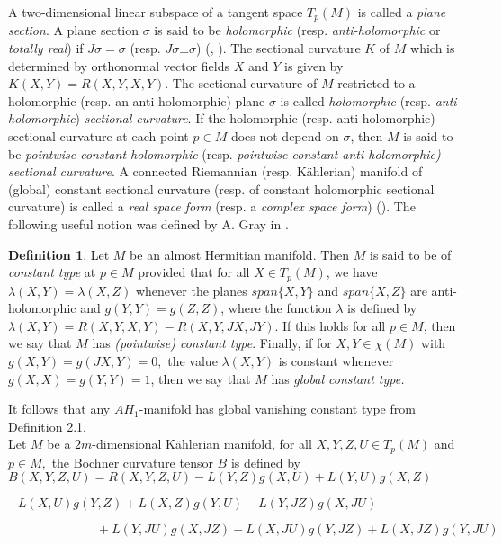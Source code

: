 \documentclass{amsart}
\newtheorem*{theorem A}{Theorem A}
\newtheorem*{theorem B}{N\"olker's Theorem}
\theoremstyle{remark}
\theoremstyle{remark}
\theoremstyle{definition}
\newtheorem{definition}{Definition}[section]
\numberwithin{equation}{section}
\begin{document}
A  two-dimensional linear subspace of a tangent space $T_{p}(M)$ is
called a \emph{plane section}. A plane section $\sigma$ is said to
be \emph{holomorphic} (resp.\emph{ anti-holomorphic} or
\emph{totally real}) if $J\sigma=\sigma$ (resp. $J\sigma\bot\sigma$)
(\cite{BChe}, \cite{Yama}). The sectional curvature $K$ of $M$ which
is determined by orthonormal vector fields $X$ and $Y$ is given by
$K(X,Y)=R(X,Y,X,Y).$ The  sectional curvature of $M$ restricted to a
holomorphic (resp. an anti-holomorphic) plane $\sigma$ is called
\emph{holomorphic} (resp. \emph{anti-holomorphic}) \emph{sectional
curvature}. If the holomorphic (resp. anti-holomorphic) sectional
curvature at each point $p\in M$ does not depend on $\sigma$, then
$M$ is said to be \emph{ pointwise constant holomorphic} (resp.
\emph{pointwise constant anti-holomorphic) sectional curvature}. A
connected Riemannian (resp. K\"{a}hlerian) manifold of (global)
constant sectional curvature (resp. of constant holomorphic
sectional curvature) is called a \emph{real space form} (resp. a
\emph{complex space form}) (\cite{BChe,Vanh,Kas,Yan}). The following
useful notion was defined by A. Gray in \cite{Gray}.
\begin{definition} Let $M$ be an almost Hermitian manifold. Then $M$ is said
to be of \emph{constant type} at  $p\in M$ provided that for all
$X\in T_{p}(M)$, we have $\lambda(X,Y)=\lambda(X,Z)$ whenever the
planes  $span\{X,Y\}$ and $span\{X,Z\}$ are  anti-holomorphic and
$g(Y,Y)=g(Z,Z)$, where the function $\lambda$ is defined by
$\lambda(X,Y)=R(X,Y,X,Y)-R(X,Y,JX,JY)$. If this holds for all $p\in
M$, then we say that  $M$ has \emph{(pointwise) constant type}.
Finally, if for $X,Y\in\chi(M)$ with $g(X,Y)=g(JX,Y)=0,$ the value
$\lambda(X,Y)$ is constant whenever $g(X,X)=g(Y,Y)=1$,
 then we say that $M$ has \emph{global constant type.}
\end{definition}
It follows that any $AH_{1}$-manifold has global vanishing constant type from Definition 2.1.\\

Let $M$ be a $2m$-dimensional K\"{a}hlerian manifold, for all $X,Y,Z,U\in T_{p}(M)$ and $p\in M,$
the Bochner curvature tensor $B$ \cite{Kassab} is defined by\\

$B(X,Y,Z,U)=R(X,Y,Z,U)-L(Y,Z)g(X,U)+L(Y,U)g(X,Z)$

$\quad\quad\quad\quad\quad\quad\quad$$-L(X,U)g(Y,Z)+L(X,Z)g(Y,U)-L(Y,JZ)g(X,JU)$

$\quad\quad\quad\quad\quad\quad\quad+L(Y,JU)g(X,JZ)-L(X,JU)g(Y,JZ)+L(X,JZ)g(Y,JU)$
\end{document}

